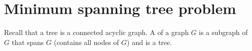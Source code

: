 %
%
%
%
%

\chapter{Minimum spanning tree problem} %
\label{sec:MST}
Recall that a tree is a connected acyclic graph. A  of a graph $G$ is a subgraph of $G$ that spans $G$ (contains all nodes of $G$) and is a tree.

